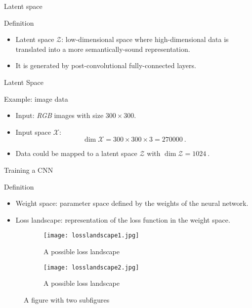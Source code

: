\begin{frame}{Latent space}
    \begin{definitionblock}{Definition}
        \centering
        \begin{itemize}
            \item<1-> Latent space $\mathcal{Z}$: low-dimensional space where high-dimensional data is translated into a more semantically-sound representation.
            \item <2-> It is generated by post-convolutional fully-connected layers.
        \end{itemize}
    \end{definitionblock}
\end{frame}

\begin{frame}{Latent Space}
    \begin{normalblock}{Example: image data}
        \begin{itemize}
            \item <1-> Input: \emph{RGB} images with size $300 \times 300$.
            \item <2-> Input space $\mathcal{X}$:
            \[
                \dim{\mathcal{X}} = 300\times300\times3 = \SI{270000}{}.
            \]
            \item <3-> Data could be mapped to a latent space $\mathcal{Z}$ with $\dim \mathcal{Z}= \SI{1024}{}$.
        \end{itemize}
    \end{normalblock}
\end{frame}

\begin{frame}{Training a CNN}
    \begin{definitionblock}{Definition}
        \begin{itemize}
            \item <1-> Weight space: parameter space defined by the weights of the neural network.
            \item <2-> Loss landscape: representation of the loss function in the weight space.
        \end{itemize}
    \end{definitionblock}
    \begin{figure}
        \centering
        \begin{subfigure}{.5\textwidth}
            \centering
            \texttt{[image: losslandscape1.jpg]}
            \caption*{A possible loss landscape}
        \end{subfigure}%
        \begin{subfigure}{.5\textwidth}
            \centering
            \centering
            \texttt{[image: losslandscape2.jpg]}
            \caption*{A possible loss landscape}
        \end{subfigure}
        \caption{A figure with two subfigures}
    \end{figure}
\end{frame}
